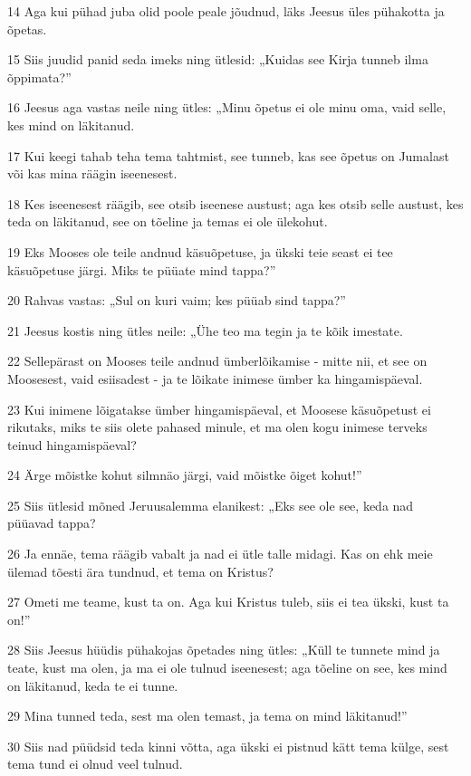 \par 14 Aga kui pühad juba olid poole peale jõudnud, läks Jeesus üles pühakotta ja õpetas.
\par 15 Siis juudid panid seda imeks ning ütlesid: „Kuidas see Kirja tunneb ilma õppimata?”
\par 16 Jeesus aga vastas neile ning ütles: „Minu õpetus ei ole minu oma, vaid selle, kes mind on läkitanud.
\par 17 Kui keegi tahab teha tema tahtmist, see tunneb, kas see õpetus on Jumalast või kas mina räägin iseenesest.
\par 18 Kes iseenesest räägib, see otsib iseenese austust; aga kes otsib selle austust, kes teda on läkitanud, see on tõeline ja temas ei ole ülekohut.
\par 19 Eks Mooses ole teile andnud käsuõpetuse, ja ükski teie seast ei tee käsuõpetuse järgi. Miks te püüate mind tappa?”
\par 20 Rahvas vastas: „Sul on kuri vaim; kes püüab sind tappa?”
\par 21 Jeesus kostis ning ütles neile: „Ühe teo ma tegin ja te kõik imestate.
\par 22 Sellepärast on Mooses teile andnud ümberlõikamise - mitte nii, et see on Moosesest, vaid esiisadest - ja te lõikate inimese ümber ka hingamispäeval.
\par 23 Kui inimene lõigatakse ümber hingamispäeval, et Moosese käsuõpetust ei rikutaks, miks te siis olete pahased minule, et ma olen kogu inimese terveks teinud hingamispäeval?
\par 24 Ärge mõistke kohut silmnäo järgi, vaid mõistke õiget kohut!”
\par 25 Siis ütlesid mõned Jeruusalemma elanikest: „Eks see ole see, keda nad püüavad tappa?
\par 26 Ja ennäe, tema räägib vabalt ja nad ei ütle talle midagi. Kas on ehk meie ülemad tõesti ära tundnud, et tema on Kristus?
\par 27 Ometi me teame, kust ta on. Aga kui Kristus tuleb, siis ei tea ükski, kust ta on!”
\par 28 Siis Jeesus hüüdis pühakojas õpetades ning ütles: „Küll te tunnete mind ja teate, kust ma olen, ja ma ei ole tulnud iseenesest; aga tõeline on see, kes mind on läkitanud, keda te ei tunne.
\par 29 Mina tunned teda, sest ma olen temast, ja tema on mind läkitanud!”
\par 30 Siis nad püüdsid teda kinni võtta, aga ükski ei pistnud kätt tema külge, sest tema tund ei olnud veel tulnud.
